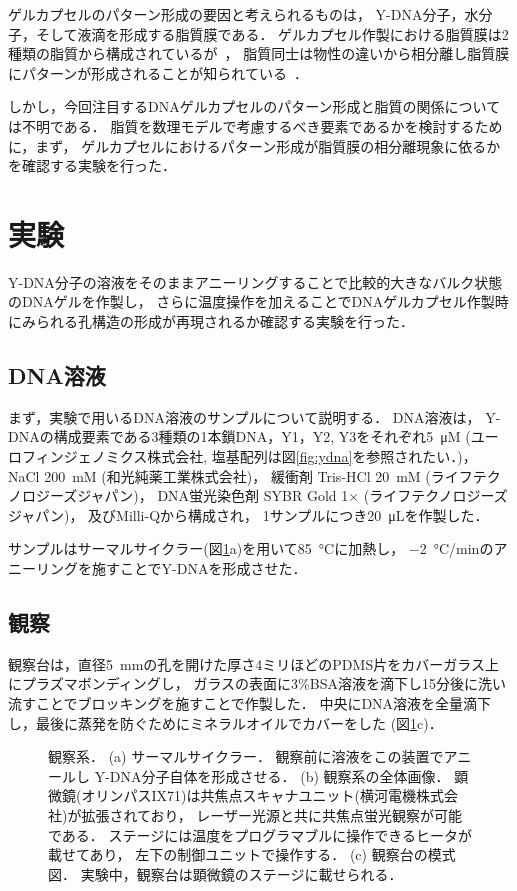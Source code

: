 ゲルカプセルのパターン形成の要因と考えられるものは，
Y-DNA分子，水分子，そして液滴を形成する脂質膜である．
ゲルカプセル作製における脂質膜は2種類の脂質から構成されているが~\cite{morita2017formation}，
脂質同士は物性の違いから相分離し脂質膜にパターンが形成されることが知られている~\cite{yanagisawa2014multiple}．

しかし，今回注目するDNAゲルカプセルのパターン形成と脂質の関係については不明である．
脂質を数理モデルで考慮するべき要素であるかを検討するために，まず，
ゲルカプセルにおけるパターン形成が脂質膜の相分離現象に依るかを確認する実験を行った．


\section{実験}
Y-DNA分子の溶液をそのままアニーリングすることで比較的大きなバルク状態のDNAゲルを作製し，
さらに温度操作を加えることでDNAゲルカプセル作製時にみられる孔構造の形成が再現されるか確認する実験を行った．


\subsection{DNA溶液}
まず，実験で用いるDNA溶液のサンプルについて説明する．
DNA溶液は，
Y-DNAの構成要素である3種類の1本鎖DNA，Y1，Y2, Y3をそれぞれ\SI{5}{\micro M} (ユーロフィンジェノミクス株式会社, 塩基配列は図\ref{fig:ydna}を参照されたい．)，
NaCl \SI{200}{mM} (和光純薬工業株式会社)，
緩衝剤 Tris-HCl \SI{20}{mM} (ライフテクノロジーズジャパン)，
DNA蛍光染色剤 SYBR Gold 1× (ライフテクノロジーズジャパン)，
及びMilli-Qから構成され，
1サンプルにつき\SI{20}{\micro L}を作製した．

サンプルはサーマルサイクラー(図\ref{fig:equipments}a)を用いて\SI{85}{\celsius}に加熱し，
\SI{-2}{\celsius/min}のアニーリングを施すことでY-DNAを形成させた．


\subsection{観察}
観察台は，直径\SI{5}{mm}の孔を開けた厚さ4ミリほどのPDMS片をカバーガラス上にプラズマボンディングし，
ガラスの表面に3\%BSA溶液を滴下し15分後に洗い流すことでブロッキングを施すことで作製した．
中央にDNA溶液を全量滴下し，最後に蒸発を防ぐためにミネラルオイルでカバーをした
(図\ref{fig:equipments}c)．
\begin{figure}
    \centering
    
    \caption{
        観察系．
        (a) サーマルサイクラー．
            観察前に溶液をこの装置でアニールし
            Y-DNA分子自体を形成させる．
        (b) 観察系の全体画像．
            顕微鏡(オリンパスIX71)は共焦点スキャナユニット(横河電機株式会社)が拡張されており，
            レーザー光源と共に共焦点蛍光観察が可能である．
            ステージには温度をプログラマブルに操作できるヒータが載せてあり，
            左下の制御ユニットで操作する．
        (c) 観察台の模式図．
            実験中，観察台は顕微鏡のステージに載せられる．
    }
    \label{fig:equipments}
\end{figure}

